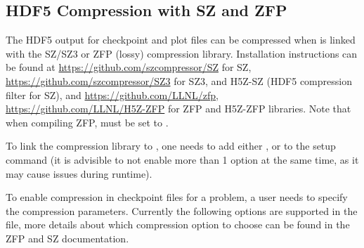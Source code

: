 \subsection{HDF5 Compression with SZ and ZFP}
The HDF5 output for checkpoint and plot files can be compressed when \flashx is 
linked with the SZ/SZ3 or ZFP (lossy) compression library.
Installation instructions can be found at \url{https://github.com/szcompressor/SZ}
for SZ, \url{https://github.com/szcompressor/SZ3} for SZ3, and H5Z-SZ 
(HDF5 compression filter for SZ), and \url{https://github.com/LLNL/zfp}, 
\url{https://github.com/LLNL/H5Z-ZFP} for ZFP and H5Z-ZFP libraries.
Note that when compiling ZFP,  must be set to .

To link the compression library to \flashx, one needs to add either , 
 or  to the setup command (it is advisible to not enable 
more than 1 option at the same time, as it may cause issues during runtime).

To enable compression in checkpoint files for a \flashx problem, a user needs to specify the compression parameters.
Currently the following options are supported in the  file, more details
about which compression option to choose can be found in the ZFP and SZ documentation.


